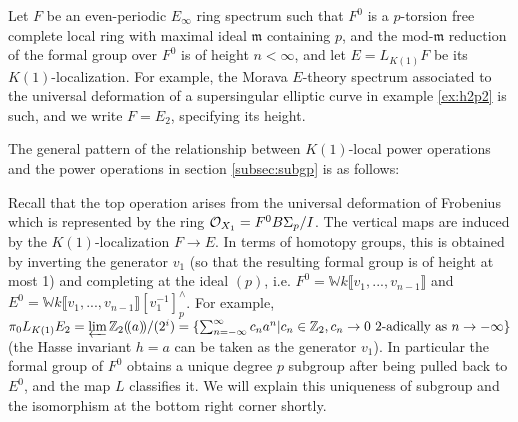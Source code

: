\documentclass{gtpart}
\theoremstyle{definition}
\theoremstyle{remark}
\newcommand{\mb}[1]{\mathbb{#1}}
\newcommand{\mf}[1]{\mathfrak{#1}}
\newcommand{\CO}{{\cal O}}
\begin{document}
Let $F$ be an even-periodic $E_\infty$ ring spectrum such that $F^0$ is a 
$p$-torsion free complete local ring with maximal ideal $\mf m$ 
containing $p$, and the mod-$\mf m$ reduction of the formal group over 
$F^0$ is of height $n < \infty$, and let $E = L_{K(1)} F$ be its 
$K(1)$-localization.  For example, the Morava $E$-theory spectrum 
associated to the universal deformation of a supersingular elliptic curve 
in example \ref{ex:h2p2} is such, and we write $F = E_2$, 
specifying its height.  

The general pattern of the relationship between $K(1)$-local power operations 
and the power operations in section \ref{subsec:subgp} is as follows: 
\begin{center}
\end{center}
Recall that the top operation arises from the universal deformation of 
Frobenius which is represented by the ring 
$\CO_{X_1} = F^0 B\Sigma_p/I$.  
The vertical maps are induced by the $K(1)$-localization $F \to E$.  In 
terms of homotopy groups, this is obtained by inverting the generator $v_1$ 
(so that the resulting formal group is of height at most 1) and 
completing at the ideal $(p)$, i.e.\thinspace
$F^0 = {\mb W}k \llbracket v_1,...,v_{n-1} \rrbracket$ and 
$E^0 = {\mb W}k \llbracket v_1,...,v_{n-1} \rrbracket [v_1^{-1}]_p^\wedge$.  
For example, $\pi_0 L_{K(1)} E_2 = \varprojlim {\mb Z_2} (\!(a)\!) /(2^i) = 
\{\sum_{n = -\infty}^{\infty} c_n a^n | c_n \in {\mb Z}_2, 
c_n \to 0 \text{~2-adically as~} n \to -\infty\}$ (the Hasse invariant $h = a$ can be taken as the generator $v_1$).  In particular the 
formal group of $F^0$ obtains a unique degree $p$ subgroup after being 
pulled back to $E^0$, and the map $L$ classifies it.  We will explain 
this uniqueness of subgroup and the isomorphism at the bottom right 
corner shortly.  
\end{document}
